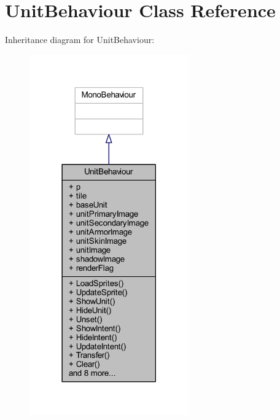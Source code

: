 \hypertarget{class_unit_behaviour}{}\section{Unit\+Behaviour Class Reference}
\label{class_unit_behaviour}


Inheritance diagram for Unit\+Behaviour\+:
\nopagebreak
\begin{figure}[H]
\begin{center}
\leavevmode
\includegraphics[width=194pt]{class_unit_behaviour__inherit__graph}
\end{center}
\end{figure}


